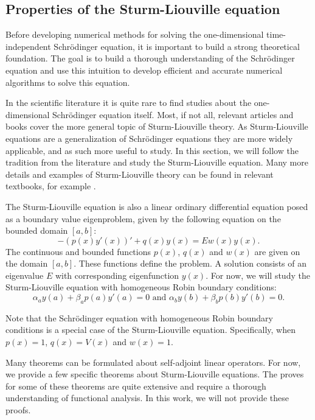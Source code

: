 \subsection{Properties of the Sturm-Liouville equation}

Before developing numerical methods for solving the one-dimensional time-independent Schrödinger equation, it is important to build a strong theoretical foundation. The goal is to build a thorough understanding of the Schrödinger equation and use this intuition to develop efficient and accurate numerical algorithms to solve this equation.

In the scientific literature it is quite rare to find studies about the one-dimensional Schrödinger equation itself. Most, if not all, relevant articles and books cover the more general topic of Sturm-Liouville theory. As Sturm-Liouville equations are a generalization of Schrödinger equations they are more widely applicable, and as such more useful to study. In this section, we will follow the tradition from the literature and study the Sturm-Liouville equation. Many more details and examples of Sturm-Liouville theory can be found in relevant textbooks, for example \cite[Chapter~5]{sagan_boundary_1961}.

The Sturm-Liouville equation is also a linear ordinary differential equation posed as a boundary value eigenproblem, given by the following equation on the bounded domain $[a, b]$:
\begin{equation}\label{equ:c2_sturm_liovuille_equation}
    -(p(x) y'(x))' + q(x) y(x) = E w(x) y(x)\text{.}
\end{equation}
The continuous and bounded functions $p(x)$, $q(x)$ and $w(x)$ are given on the domain $[a, b]$. These functions define the problem. A solution consists of an eigenvalue $E$ with corresponding eigenfunction $y(x)$. For now, we will study the Sturm-Liouville equation with homogeneous Robin boundary conditions:
\begin{equation}\label{equ:c2_sturm_liovuille_boundary}
    \alpha_a y(a) + \beta_a p(a) y'(a) = 0 \text{ and } \alpha_b y(b) + \beta_b p(b) y'(b) = 0\text{.}
\end{equation}

Note that the Schrödinger equation with homogeneous Robin boundary conditions is a special case of the Sturm-Liouville equation. Specifically, when $p(x) = 1$, $q(x) = V(x)$ and $w(x) = 1$.

Many theorems can be formulated about self-adjoint linear operators. For now, we provide a few specific theorems about Sturm-Liouville equations. The proves for some of these theorems are quite extensive and require a thorough understanding of functional analysis. In this work, we will not provide these proofs.

